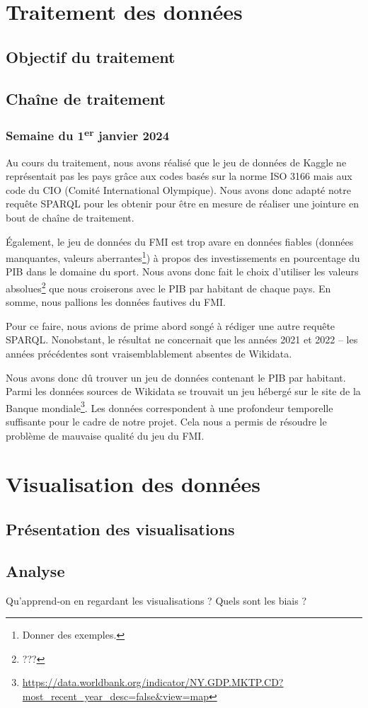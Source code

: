 \documentclass[hidelinks, 12pt]{article}
\begin{document}
	\section{Traitement des données}
	
		\subsection{Objectif du traitement}
		
		\subsection{Chaîne de traitement}
		
			\subsubsection{Semaine du 1\textsuperscript{er} janvier 2024}
		
			Au cours du traitement, nous avons réalisé que le jeu de données de Kaggle ne représentait pas les pays grâce aux codes basés sur la norme ISO 3166 mais aux code du CIO (Comité International Olympique). Nous avons donc adapté notre requête SPARQL pour les obtenir pour être en mesure de réaliser une jointure en bout de chaîne de traitement.
		
			Également, le jeu de données du FMI est trop avare en données fiables (données manquantes, valeurs aberrantes\footnote{Donner des exemples.}) à propos des investissements en pourcentage du PIB dans le domaine du sport. Nous avons donc fait le choix d'utiliser les valeurs absolues\footnote{???} que nous croiserons avec le PIB par habitant de chaque pays. En somme, nous pallions les données fautives du FMI.
		
			Pour ce faire, nous avions de prime abord songé à rédiger une autre requête SPARQL. Nonobstant, le résultat ne concernait que les années 2021 et 2022 -- les années précédentes sont vraisemblablement absentes de Wikidata.
		
			Nous avons donc dû trouver un jeu de données contenant le PIB par habitant. Parmi les données sources de Wikidata se trouvait un jeu hébergé sur le site de la Banque mondiale\footnote{\url{https://data.worldbank.org/indicator/NY.GDP.MKTP.CD?most_recent_year_desc=false&view=map}}. Les données correspondent à une profondeur temporelle suffisante pour le cadre de notre projet. Cela nous a permis de résoudre le problème de mauvaise qualité du jeu du FMI.
		

	\section{Visualisation des données}
	
		\subsection{Présentation des visualisations}
		
		\subsection{Analyse}
		
		Qu'apprend-on en regardant les visualisations ? Quels sont les biais ?
	\newpage
	
	\tableofcontents
\end{document}
